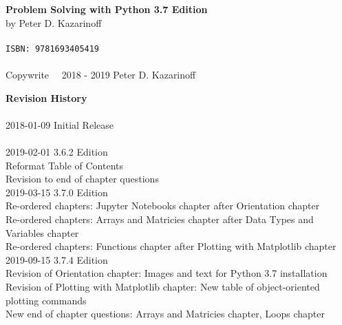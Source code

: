 
\textbf{Problem Solving with Python 3.7 Edition} \\
by Peter D. Kazarinoff \\
\\
\texttt{ISBN: 9781693405419} \\
\\
Copywrite \  \textcopyright \  2018 - 2019 Peter D. Kazarinoff\\

\vspace{3in}

\textbf{Revision History}\\
\\
2018-01-09 Initial Release\\
\\
2019-02-01 3.6.2 Edition\\
Reformat Table of Contents\\
Revision to end of chapter questions\\

2019-03-15 3.7.0 Edition \\
Re-ordered chapters: Jupyter Notebooks chapter after Orientation chapter \\
Re-ordered chapters: Arrays and Matricies chapter after Data Types and Variables chapter \\
Re-ordered chapters: Functions chapter after Plotting with Matplotlib chapter \\

2019-09-15 3.7.4 Edition \\
Revision of Orientation chapter: Images and text for Python 3.7 installation \\
Revision of Plotting with Matplotlib chapter: New table of object-oriented plotting commands \\
New end of chapter questions: Arrays and Matricies chapter, Loops chapter \\
